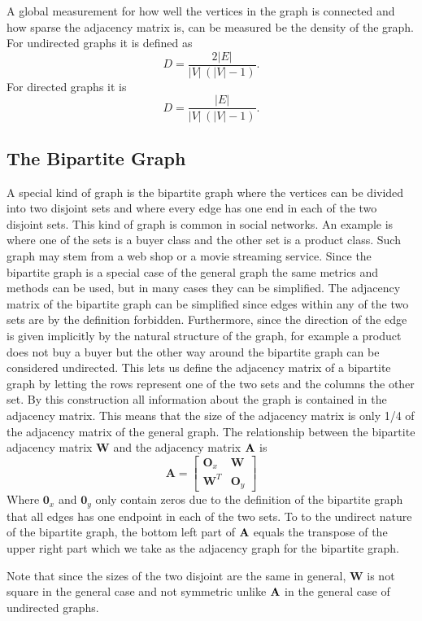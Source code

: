A global measurement for how well the vertices in the graph is connected and how sparse the adjacency matrix is, can be measured be the density of the graph. For undirected graphs it is defined as\cite{density}
$$D =  \frac{2|E|}{|V|\,(|V|-1)}.$$
For directed graphs it is
$$D = \frac{|E|}{|V|\,(|V|-1)}.$$

\subsection{The Bipartite Graph}
A special kind of graph is the bipartite graph where the vertices can be divided into two disjoint sets and where every edge has one end in each of the two disjoint sets. This kind of graph is common in social networks. An example is where one of the sets is a buyer class and the other set is a product class. Such graph may stem from a web shop or a movie streaming service. Since the bipartite graph is a special case of the general graph \graph the same metrics and methods can be used, but in many cases they can be simplified. The adjacency matrix of the bipartite graph can be simplified since edges within any of the two sets are by the definition forbidden. Furthermore, since the direction of the edge is given implicitly by the natural structure of the graph, for example a product does not buy a buyer but the other way around the bipartite graph can be considered undirected. This lets us define the adjacency matrix of a bipartite graph by letting the rows represent one of the two sets and the columns the other set. By this construction all information about the graph is contained in the adjacency matrix. This means that the size of the adjacency matrix is only 1/4 of the adjacency matrix of the general graph. The relationship between the bipartite adjacency matrix $\textbf{W}$ and the adjacency matrix $\textbf{A}$ is
$$
\textbf{A} = \left[
\begin{matrix}
  \textbf{O}_x & \textbf{W} \\
  \textbf{W}^T & \textbf{O}_y
\end{matrix}
\right]
$$
Where $\textbf{0}_x$ and $\textbf{0}_y$ only contain zeros due to the definition of the bipartite graph that all edges has one endpoint in each of the two sets. To to the undirect nature of the bipartite graph, the bottom left part of $\textbf{A}$ equals the transpose of the upper right part which we take as the adjacency graph for the bipartite graph.

Note that since the sizes of the two disjoint are the same in general, $\textbf{W}$ is not square in the general case and not symmetric unlike $\textbf{A}$ in the general case of undirected graphs.

